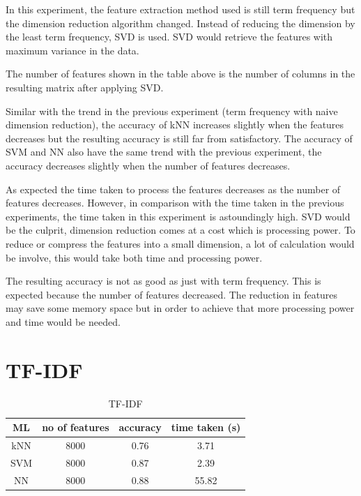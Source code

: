 In this experiment, the feature extraction method used is still term frequency but the dimension reduction algorithm changed. Instead of reducing the dimension by the least term frequency, SVD is used. SVD would retrieve the features with maximum variance in the data.

The number of features shown in the table above is the number of columns in the resulting matrix after applying SVD. 

Similar with the trend in the previous experiment (term frequency with naive dimension reduction), the accuracy of kNN increases slightly when the features decreases but the resulting accuracy is still far from satisfactory. The accuracy of SVM and NN also have the same trend with the previous experiment, the accuracy decreases slightly when the number of features decreases. 

As expected the time taken to process the features decreases as the number of features decreases. However, in comparison with the time taken in the previous experiments, the time taken in this experiment is astoundingly high. SVD would be the culprit, dimension reduction comes at a cost which is processing power. To reduce or compress the features into a small dimension, a lot of calculation would be involve, this would take both time and processing power.

The resulting accuracy is not as good as just with term frequency. This is expected because the number of features decreased. The reduction in features may save some memory space but in order to achieve that more processing power and time would be needed.

\section{TF-IDF}

\begin{table} [ht]
	\centering
	\begin{tabular}{|| c | c | c | c||}
		\hline
		ML & no of features & accuracy & time taken (s) \\ [0.5ex]
		\hline\hline
		kNN & 8000 & 0.76 & 3.71 \\ 
		\hline
		SVM & 8000 & 0.87 & 2.39 \\
		\hline
		NN & 8000 & 0.88 & 55.82 \\
		\hline
	\end{tabular}
\caption{TF-IDF}
\label{tbl:tfidf}
\end{table}

